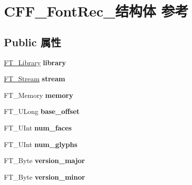 \hypertarget{struct_c_f_f___font_rec__}{}\section{C\+F\+F\+\_\+\+Font\+Rec\+\_\+结构体 参考}
\label{struct_c_f_f___font_rec__}
\subsection*{Public 属性}
\begin{DoxyCompactItemize}
\item 
\mbox{\label{struct_c_f_f___font_rec___a82050e317d91c3284d21be512eaaf6b4}} 
\hyperlink{struct_f_t___library_rec__}{F\+T\+\_\+\+Library} {\bfseries library}
\item 
\mbox{\label{struct_c_f_f___font_rec___a756c5b9e707ff6ff95dd5a2a7a225217}} 
\hyperlink{struct_f_t___stream_rec__}{F\+T\+\_\+\+Stream} {\bfseries stream}
\item 
\mbox{\label{struct_c_f_f___font_rec___ad98d7a458521e6be541430030cb2a6f9}} 
F\+T\+\_\+\+Memory {\bfseries memory}
\item 
\mbox{\label{struct_c_f_f___font_rec___afa651befea0b16abb0384726e76ccfa1}} 
F\+T\+\_\+\+U\+Long {\bfseries base\+\_\+offset}
\item 
\mbox{\label{struct_c_f_f___font_rec___a11972f1fc14dabe555c335d4faa3307e}} 
F\+T\+\_\+\+U\+Int {\bfseries num\+\_\+faces}
\item 
\mbox{\label{struct_c_f_f___font_rec___af938965b67a100d7e1a487059321c3d6}} 
F\+T\+\_\+\+U\+Int {\bfseries num\+\_\+glyphs}
\item 
\mbox{\label{struct_c_f_f___font_rec___a3f3d5b834c2a7cd26c6ce9ea7357cfcf}} 
F\+T\+\_\+\+Byte {\bfseries version\+\_\+major}
\item 
\mbox{\label{struct_c_f_f___font_rec___ac34ee540c6e483c7ca3c3ec8dd38bae6}} 
F\+T\+\_\+\+Byte {\bfseries version\+\_\+minor}

\end{DoxyCompactItemize}
